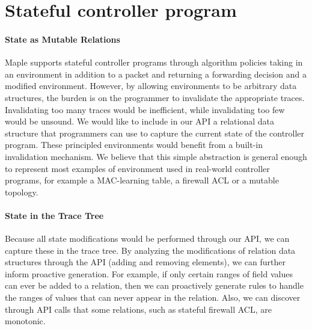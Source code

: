\documentclass[12pt]{article}
\begin{document}
\section*{Stateful controller program}

\paragraph{State as Mutable Relations}
Maple supports stateful controller programs through algorithm policies taking in an environment in addition to a packet and returning a forwarding decision and a modified environment. However, by allowing environments to be arbitrary data structures, the burden is on the programmer to invalidate the appropriate traces. Invalidating too many traces would be inefficient, while invalidating too few would be unsound. We would like to include in our API a relational data structure that programmers can use to capture the current state of the controller program. These principled environments would benefit from a built-in invalidation mechanism. We believe that this simple abstraction is general enough to represent most examples of environment used in real-world controller programs, for example a MAC-learning table, a firewall ACL or a mutable topology. 

\paragraph{State in the Trace Tree}
Because all state modifications would be performed through our API, we can capture these in the trace tree.  
By analyzing the modifications of relation data structures through the API (adding and removing elements), we can further inform proactive generation. For example, if only certain ranges of field values can ever be added to a relation, then we can proactively generate rules to handle the ranges of values that can never appear in the relation. Also, we can discover through API calls that some relations, such as stateful firewall ACL, are monotonic.



	
\end{document}
